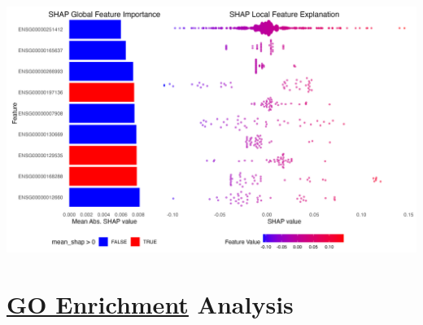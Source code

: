 \documentclass[
]{article}
\begin{document}
\begin{center}\includegraphics[width=1\linewidth]{images/demo_shap_plot_2_full} \end{center}

\hypertarget{go-enrichment-analysis}{%
\section{\texorpdfstring{\href{https://bioconductor.org/packages/release/bioc/html/clusterProfiler.html}{GO
Enrichment}
Analysis}{GO Enrichment Analysis}}\label{go-enrichment-analysis}}
\end{document}
